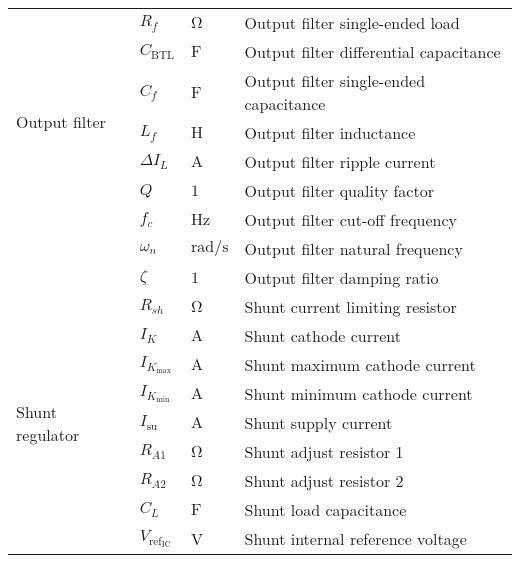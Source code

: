 \begin{longtable}{@{}llll@{}}
	\multirow{7}{*}{Output filter}  & $R_{f}$ & $\si{\ohm}$ & Output filter single-ended load \\
	& $C_{\mathrm{BTL}}$ & $\si{\farad}$ & Output filter differential capacitance \\
	& $C_{f}$ & $\si{\farad}$ & Output filter single-ended capacitance \\
	& $L_{f}$ & $\si{\henry}$ & Output filter inductance \\
	& $\Delta I_{L}$ & $\si{\ampere}$ & Output filter ripple current \\
	& $Q$ & $1$ & Output filter quality factor \\
	& $f_{c}$ & $\si{\hertz}$ & Output filter cut-off frequency \\ 
	& $\omega_{n}$ & $\si{\radian\per\second}$ & Output filter natural frequency \\
	& $\zeta$ & $1$ & Output filter damping ratio \\ \midrule
	\multirow{9}{*}{Shunt regulator}  & $R_{sh}$ & $\si{\ohm}$ & Shunt current limiting resistor \\
	& $I_{K}$ & $\si{\ampere}$ & Shunt cathode current \\
	& $I_{K_{\mathrm{max}}}$ & $\si{\ampere}$ & Shunt maximum cathode current \\
	& $I_{K_{\mathrm{min}}}$ & $\si{\ampere}$ & Shunt minimum cathode current \\
	& $I_{\mathrm{su}}$ & $\si{\ampere}$ & Shunt supply current \\
	& $R_{A1}$ & $\si{\ohm}$ & Shunt adjust resistor 1 \\
	& $R_{A2}$ & $\si{\ohm}$ & Shunt adjust resistor 2 \\
	& $C_{L}$ & $\si{\farad}$ & Shunt load capacitance \\
	& $V_{\mathrm{ref}_{\mathrm{IC}}}$ & \si{\volt} & Shunt internal reference voltage
	\label{tab:denotation}
\end{longtable}